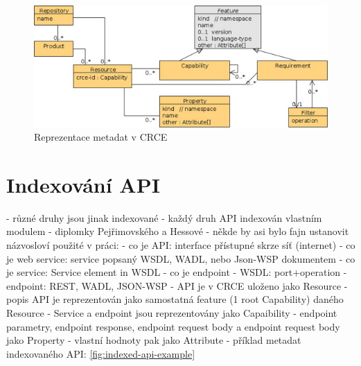 \documentclass[czech,DP]{thesiskiv}
\begin{document}
 \begin{figure}[h]
 	\centering
 	\includegraphics{resource-uml}
 	\caption{Reprezentace metadat v CRCE}
 	\label{fig:crce-resource-uml}
 \end{figure}

\section{Indexování API}

- různé druhy jsou jinak indexované
- každý druh API indexován vlastním modulem - diplomky Pejřimovského \cite{pejrimovsky2015ws} a Hessové \cite{hessova2015rest}
- někde by asi bylo fajn ustanovit názvosloví použité v práci:
	- co je API: interface přístupné skrze síť (internet)
	- co je web service: service popsaný WSDL, WADL, nebo Json-WSP dokumentem
	- co je service: Service element in WSDL
	- co je endpoint
		- WSDL: port+operation
		- endpoint: REST, WADL, JSON-WSP
- API je v CRCE uloženo jako Resource		
- popis API je reprezentován jako samostatná feature (1 root Capability) daného Resource
- Service a endpoint jsou reprezentovány jako Capaibility
- endpoint parametry, endpoint response, endpoint request body a endpoint request body jako Property
- vlastní hodnoty pak jako Attribute
- příklad metadat indexovaného API: \ref{fig:indexed-api-example}
\end{document}
